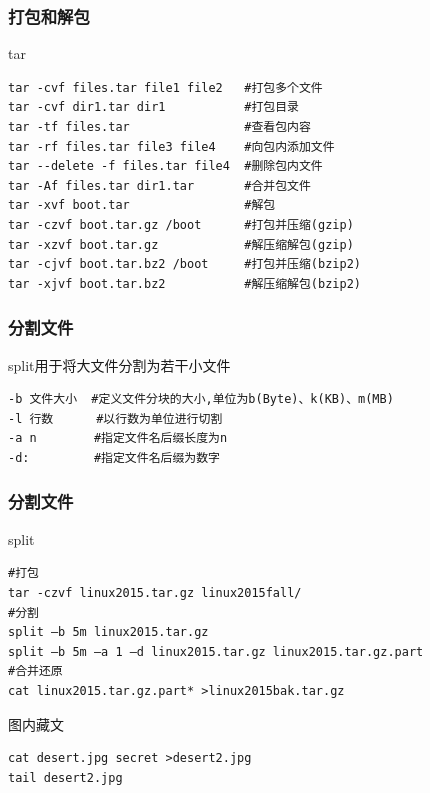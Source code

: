 \documentclass[xcolor=svgnames,presentation]{beamer}
\begin{document}
\begin{frame}[fragile]
\frametitle{打包和解包}
\label{sec-3-1-7}
\begin{block}{tar}
\label{sec-3-1-7-1}


\begin{verbatim}
tar -cvf files.tar file1 file2   #打包多个文件
tar -cvf dir1.tar dir1           #打包目录
tar -tf files.tar                #查看包内容
tar -rf files.tar file3 file4    #向包内添加文件
tar --delete -f files.tar file4  #删除包内文件
tar -Af files.tar dir1.tar       #合并包文件
tar -xvf boot.tar                #解包
tar -czvf boot.tar.gz /boot      #打包并压缩(gzip)
tar -xzvf boot.tar.gz            #解压缩解包(gzip)
tar -cjvf boot.tar.bz2 /boot     #打包并压缩(bzip2)
tar -xjvf boot.tar.bz2           #解压缩解包(bzip2)
\end{verbatim}
\end{block}
\end{frame}
\begin{frame}[fragile]
\frametitle{分割文件}
\label{sec-3-1-8}
\begin{exampleblock}{split用于将大文件分割为若干小文件}
\label{sec-3-1-8-1}


\begin{verbatim}
-b 文件大小  #定义文件分块的大小,单位为b(Byte)、k(KB)、m(MB)
-l 行数      #以行数为单位进行切割
-a n        #指定文件名后缀长度为n
-d:         #指定文件名后缀为数字
\end{verbatim}
\end{exampleblock}
\end{frame}
\begin{frame}[fragile]
\frametitle{分割文件}
\label{sec-3-1-9}
\begin{exampleblock}{split}
\label{sec-3-1-9-1}


\begin{verbatim}
#打包
tar -czvf linux2015.tar.gz linux2015fall/
#分割
split –b 5m linux2015.tar.gz
split –b 5m –a 1 –d linux2015.tar.gz linux2015.tar.gz.part
#合并还原
cat linux2015.tar.gz.part* >linux2015bak.tar.gz
\end{verbatim}
\end{exampleblock}
\begin{block}{图内藏文}
\label{sec-3-1-9-2}


\begin{verbatim}
cat desert.jpg secret >desert2.jpg
tail desert2.jpg
\end{verbatim}
\end{block}
\end{frame}
\end{document}
